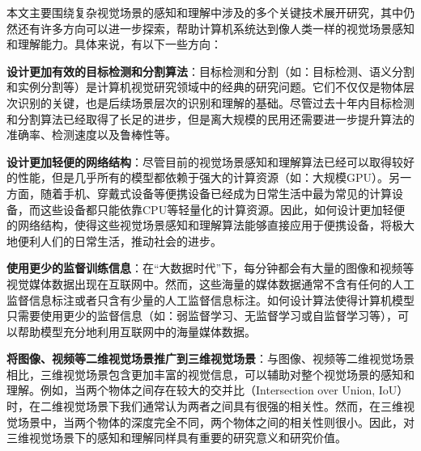 本文主要围绕复杂视觉场景的感知和理解中涉及的多个关键技术展开研究，其中仍然还有许多方向可以进一步探索，帮助计算机系统达到像人类一样的视觉场景感知和理解能力。具体来说，有以下一些方向：
\begin{asparaenum}
\item \textbf{设计更加有效的目标检测和分割算法}：目标检测和分割（如：目标检测、语义分割和实例分割等）是计算机视觉研究领域中的经典的研究问题。它们不仅仅是物体层次识别的关键，也是后续场景层次的识别和理解的基础。尽管过去十年内目标检测和分割算法已经取得了长足的进步，但是离大规模的民用还需要进一步提升算法的准确率、检测速度以及鲁棒性等。

\item \textbf{设计更加轻便的网络结构}：尽管目前的视觉场景感知和理解算法已经可以取得较好的性能，但是几乎所有的模型都依赖于强大的计算资源（如：大规模GPU）。另一方面，随着手机、穿戴式设备等便携设备已经成为日常生活中最为常见的计算设备，而这些设备都只能依靠CPU等轻量化的计算资源。因此，如何设计更加轻便的网络结构，使得这些视觉场景感知和理解算法能够直接应用于便携设备，将极大地便利人们的日常生活，推动社会的进步。

\item \textbf{使用更少的监督训练信息}：在“大数据时代”下，每分钟都会有大量的图像和视频等视觉媒体数据出现在互联网中。然而，这些海量的媒体数据通常不含有任何的人工监督信息标注或者只含有少量的人工监督信息标注。如何设计算法使得计算机模型只需要使用更少的监督信息（如：弱监督学习、无监督学习或自监督学习等），可以帮助模型充分地利用互联网中的海量媒体数据。

\item \textbf{将图像、视频等二维视觉场景推广到三维视觉场景}：与图像、视频等二维视觉场景相比，三维视觉场景包含更加丰富的视觉信息，可以辅助对整个视觉场景的感知和理解。例如，当两个物体之间存在较大的交并比（Intersection over Union, IoU）时，在二维视觉场景下我们通常认为两者之间具有很强的相关性。然而，在三维视觉场景中，当两个物体的深度完全不同，两个物体之间的相关性则很小。因此，对三维视觉场景下的感知和理解同样具有重要的研究意义和研究价值。

\end{asparaenum}
